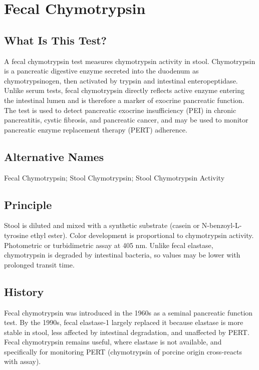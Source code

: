 \chapter{Fecal Chymotrypsin}

\section*{What Is This Test?}
A fecal chymotrypsin test measures chymotrypsin activity in stool. Chymotrypsin is a pancreatic digestive enzyme secreted into the duodenum as chymotrypsinogen, then activated by trypsin and intestinal enteropeptidase. Unlike serum tests, fecal chymotrypsin directly reflects active enzyme entering the intestinal lumen and is therefore a marker of exocrine pancreatic function. The test is used to detect pancreatic exocrine insufficiency (PEI) in chronic pancreatitis, cystic fibrosis, and pancreatic cancer, and may be used to monitor pancreatic enzyme replacement therapy (PERT) adherence.

\section*{Alternative Names}
Fecal Chymotrypsin; Stool Chymotrypsin; Stool Chymotrypsin Activity

\section*{Principle}
Stool is diluted and mixed with a synthetic substrate (casein or N-benzoyl-L-tyrosine ethyl ester). Color development is proportional to chymotrypsin activity. Photometric or turbidimetric assay at 405 nm. Unlike fecal elastase, chymotrypsin is degraded by intestinal bacteria, so values may be lower with prolonged transit time.

\section*{History}
Fecal chymotrypsin was introduced in the 1960s as a seminal pancreatic function test. By the 1990s, fecal elastase-1 largely replaced it because elastase is more stable in stool, less affected by intestinal degradation, and unaffected by PERT. Fecal chymotrypsin remains useful, where elastase is not available, and specifically for monitoring PERT (chymotrypsin of porcine origin cross-reacts with assay).

